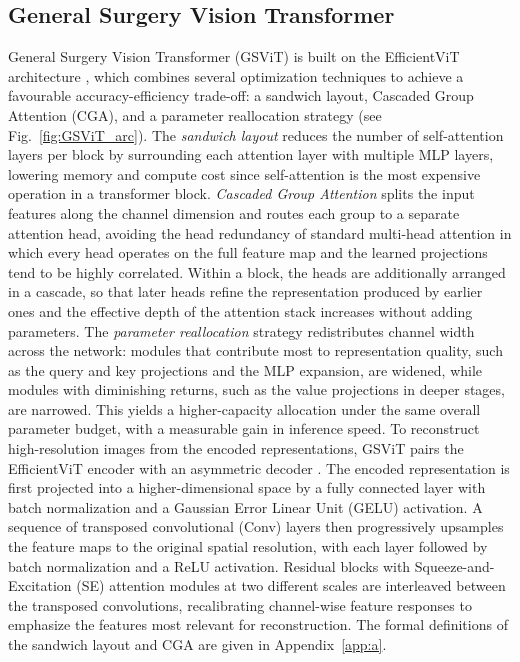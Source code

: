 \documentclass[11pt, a4paper]{article}
\begin{document}
\subsection{General Surgery Vision Transformer}
General Surgery Vision Transformer (GSViT) is built on the EfficientViT architecture \parencite{liu-2023}, which combines several optimization techniques to achieve a favourable accuracy-efficiency trade-off: a sandwich layout, Cascaded Group Attention (CGA), and a parameter reallocation strategy (see Fig.~\ref{fig:GSViT_arc}). The \textit{sandwich layout} reduces the number of self-attention layers per block by surrounding each attention layer with multiple MLP layers, lowering memory and compute cost since self-attention is the most expensive operation in a transformer block. \textit{Cascaded Group Attention} splits the input features along the channel dimension and routes each group to a separate attention head, avoiding the head redundancy of standard multi-head attention in which every head operates on the full feature map and the learned projections tend to be highly correlated. Within a block, the heads are additionally arranged in a cascade, so that later heads refine the representation produced by earlier ones and the effective depth of the attention stack increases without adding parameters. The \textit{parameter reallocation} strategy redistributes channel width across the network: modules that contribute most to representation quality, such as the query and key projections and the MLP expansion, are widened, while modules with diminishing returns, such as the value projections in deeper stages, are narrowed. This yields a higher-capacity allocation under the same overall parameter budget, with a measurable gain in inference speed. To reconstruct high-resolution images from the encoded representations, GSViT pairs the EfficientViT encoder with an asymmetric decoder \parencite{schmidgall2024general}. The encoded representation is first projected into a higher-dimensional space by a fully connected layer with batch normalization and a Gaussian Error Linear Unit (GELU) activation. A sequence of transposed convolutional (Conv) layers then progressively upsamples the feature maps to the original spatial resolution, with each layer followed by batch normalization and a ReLU activation. Residual blocks with Squeeze-and-Excitation (SE) attention modules at two different scales are interleaved between the transposed convolutions, recalibrating channel-wise feature responses to emphasize the features most relevant for reconstruction. The formal definitions of the sandwich layout and CGA are given in Appendix~\ref{app:a}.
\end{document}
